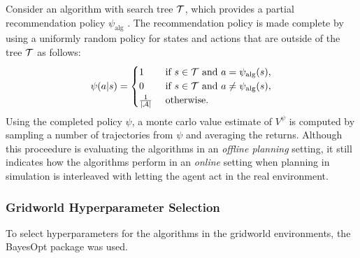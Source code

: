         Consider an algorithm with search tree $\mathcal{T}$, which provides a partial recommendation policy $\psi_{\text{alg}}$ . The recommendation policy is made complete by using a uniformly random policy for states and actions that are outside of the tree $\mathcal{T}$ as follows:
        \begin{align}
            \psi(a|s) =
            \begin{cases}
                1                       & \text{ if } s\in\mathcal{T} \text{ and } a=\psi_{\text{alg}}(s), \\
                0                       & \text{ if } s\in\mathcal{T} \text{ and } a\neq\psi_{\text{alg}}(s), \\
                \frac{1}{|\mathcal{A}|}      & \text{ otherwise.}
            \end{cases} \label{eq:full_Recommend}
        \end{align}
        Using the completed policy $\psi$, a monte carlo value estimate of $V^{\psi}$ is computed by sampling a number of trajectories from $\psi$ and averaging the returns.  Although this proceedure is evaluating the algorithms in an \textit{offline planning} setting, it still indicates how the algorithms perform in an \textit{online} setting when planning in simulation is interleaved with letting the agent act in the real environment. 


        \subsubsection{Gridworld Hyperparameter Selection}

            To select hyperparameters for the algorithms in the gridworld environments, the BayesOpt package  was used.




